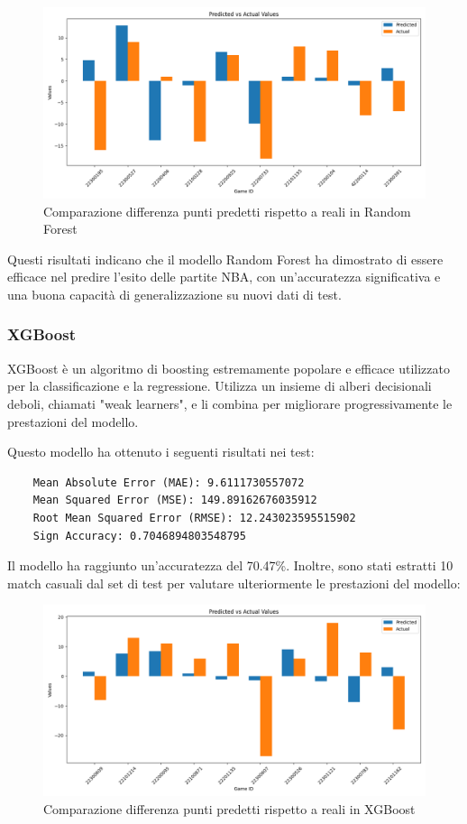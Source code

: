 \documentclass[a4paper]{article}
\numberwithin{equation}{section}
\begin{document}
\begin{figure}[H]
    \centering
    \includegraphics[width=0.7\linewidth]{img/random_forest_istogramma.png}
    \caption{Comparazione differenza punti predetti rispetto a reali in Random Forest}
    \label{fig:enter-label}
\end{figure}

Questi risultati indicano che il modello Random Forest ha dimostrato di essere efficace nel predire l'esito delle partite NBA, con un'accuratezza significativa e una buona capacità di generalizzazione su nuovi dati di test.

\subsubsection{XGBoost}

XGBoost è un algoritmo di boosting estremamente popolare e efficace utilizzato per la classificazione e la regressione. Utilizza un insieme di alberi decisionali deboli, chiamati "weak learners", e li combina per migliorare progressivamente le prestazioni del modello.

Questo modello ha ottenuto i seguenti risultati nei test:

\begin{lstlisting}
    Mean Absolute Error (MAE): 9.6111730557072
    Mean Squared Error (MSE): 149.89162676035912
    Root Mean Squared Error (RMSE): 12.243023595515902
    Sign Accuracy: 0.7046894803548795
\end{lstlisting}

Il modello ha raggiunto un'accuratezza del 70.47\%. Inoltre, sono stati estratti 10 match casuali dal set di test per valutare ulteriormente le prestazioni del modello:

\begin{figure}[H]
    \centering
    \includegraphics[width=0.7\linewidth]{img/xgboost_istogramma.png}
    \caption{Comparazione differenza punti predetti rispetto a reali in XGBoost}
    \label{fig:enter-label}
\end{figure}
\end{document}
